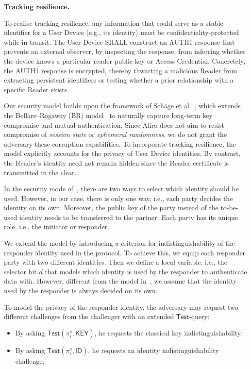 \documentclass[runningheads]{llncs}
\begin{document}
\noindent\textbf{Tracking resilience.}
{\sloppy
To realise tracking resilience, any information that could serve as a stable identifier for a User Device (e.g., its identity) must be confidentiality-\allowbreak protected while in transit.
The User Device SHALL construct an {\sf AUTH1 response} that prevents an external observer, by inspecting the response, from inferring whether the device knows a particular reader public key or Access Credential.
Concretely, the {\sf AUTH1 response} is encrypted, thereby thwarting a malicious Reader from extracting persistent identifiers or testing whether a prior relationship with a specific Reader exists.
\par}

Our security model builds upon the framework of Sch{\"a}ge et al.~\cite{PKC:SchSchLau20}, which extends the Bellare–Rogaway (BR) model~\cite{C:BelRog93} to naturally capture long-term key compromise and mutual authentication.
Since Aliro does not aim to resist compromise of \textit{session state} or \textit{ephemeral randomness}, we do not grant the adversary these corruption capabilities.
{To incorporate tracking resilience, the model explicitly accounts for the privacy of User Device identities.
By contrast, the Reader’s identity need not remain hidden since the Reader certificate is transmitted in the clear.}

In the security mode of~\cite{PKC:SchSchLau20}, there are two ways to select which identity should be used.
However, in our case, there is only one way, i.e., each party decides the identity on its own.
Moreover, the public key of the party instead of the to-be-used identity needs to be transferred to the partner.
Each party has its unique role, i.e., the initiator or responder.

We extend the model by introducing a criterion for indistinguishability of the responder identity used in the protocol. To achieve this, we equip each responder party with two different identities.
Then we define a local variable, i.e., the selector bit $d$ that models which identity is used by the responder to authenticate data with.
However, different from the model in~\cite{PKC:SchSchLau20}, we assume that the identity used by the responder is always decided on its own.

To model the privacy of the responder identity, the adversary may request two different challenges from the challenger with an extended $\mathsf{Test}$-query:
\begin{itemize}
    \item By asking $\mathsf{Test}(\pi_{i}^{s},\mathsf{KEY})$, he requests the classical key indistinguishability;
    \item By asking $\mathsf{Test}(\pi_{i}^{s}, \mathsf{ID})$, he requests an identity indistinguishability challenge.
\end{itemize}
\end{document}
